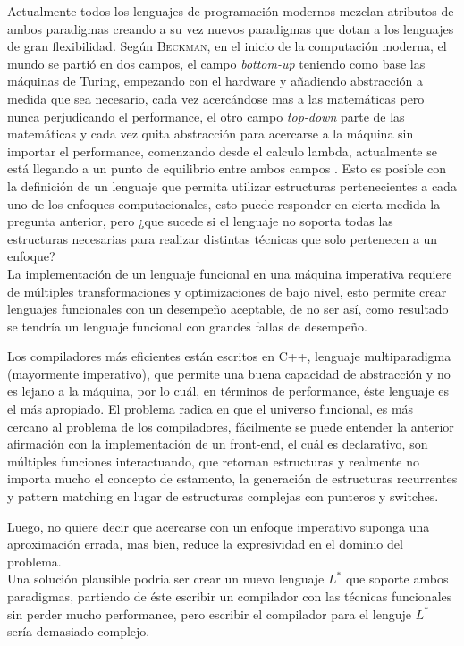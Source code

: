 Actualmente todos los lenguajes de programación modernos mezclan atributos de ambos paradigmas creando a su vez nuevos paradigmas que dotan a los lenguajes de gran flexibilidad. Según \textsc{Beckman}, en el inicio de la computación moderna, el mundo se partió en dos campos, el campo \emph{bottom-up} teniendo como base las máquinas de Turing, empezando con el hardware y añadiendo abstracción a medida que sea necesario, cada vez acercándose mas a las matemáticas pero nunca perjudicando el performance, el otro campo \emph{top-down} parte de las matemáticas y cada vez quita abstracción para acercarse a la máquina sin importar el performance, comenzando desde el calculo lambda, actualmente se está llegando a un punto de equilibrio entre ambos campos \cite{Beckman2007}  . Esto es posible con la definición de un lenguaje que permita utilizar estructuras pertenecientes a cada uno de los enfoques computacionales, esto puede responder en cierta medida la pregunta anterior, pero ¿que sucede si el lenguaje no soporta todas las estructuras necesarias para realizar distintas técnicas que solo pertenecen a un enfoque?\\

La implementación de un lenguaje funcional en una máquina imperativa requiere de múltiples transformaciones y optimizaciones de bajo nivel, esto permite crear lenguajes funcionales con un desempeño aceptable, de no ser así, como resultado se tendría un lenguaje funcional con grandes fallas de desempeño.

Los compiladores más eficientes están escritos en C++, lenguaje multiparadigma (mayormente imperativo), que permite una buena capacidad de abstracción y no es lejano a la máquina, por lo cuál, en términos de performance, éste lenguaje es el más apropiado. El problema radica en que el universo funcional, es más cercano al problema de los compiladores, fácilmente se puede entender la anterior afirmación con la implementación de un front-end, el cuál es declarativo, son múltiples funciones interactuando, que retornan estructuras y realmente no importa mucho el concepto de estamento, la generación de estructuras recurrentes y pattern matching en lugar de estructuras complejas con punteros y switches.

Luego, no quiere decir que acercarse con un enfoque imperativo suponga una aproximación errada, mas bien, reduce la expresividad en el dominio del problema.\\

Una solución plausible podria ser crear un nuevo lenguaje $L^*$ que soporte ambos paradigmas, partiendo de éste escribir un compilador con las técnicas funcionales sin perder mucho performance, pero escribir el compilador para el lenguje $L^*$ sería demasiado complejo.



